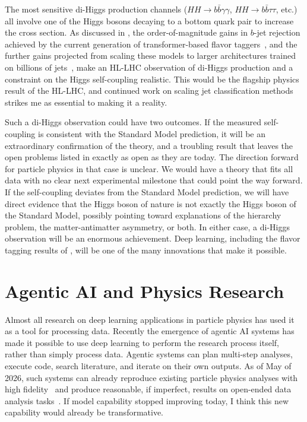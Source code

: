 The most sensitive di-Higgs production channels ($HH \rightarrow b\bar{b}\gamma\gamma$, $HH \rightarrow b\bar{b}\tau\tau$, etc.) all involve one of the Higgs bosons decaying to a bottom quark pair to increase the cross section.
As discussed in , the order-of-magnitude gains in $b$-jet rejection achieved by the current generation of transformer-based flavor taggers~\cite{ATLAS:2025dkv,Sarkar:2024vjz}, and the further gains projected from scaling these models to larger architectures trained on billions of jets~\cite{ATLAS:2026vyw,Vigl:2026ppx,Uslu:2026ywh}, make an HL-LHC observation of di-Higgs production and a constraint on the Higgs self-coupling realistic.
This would be the flagship physics result of the HL-LHC, and continued work on scaling jet classification methods strikes me as essential to making it a reality.

Such a di-Higgs observation could have two outcomes.
If the measured self-coupling is consistent with the Standard Model prediction, it will be an extraordinary confirmation of the theory, and a troubling result that leaves the open problems listed in  exactly as open as they are today.
The direction forward for particle physics in that case is unclear.
We would have a theory that fits all data with no clear next experimental milestone that could point the way forward.
If the self-coupling deviates from the Standard Model prediction, we will have direct evidence that the Higgs boson of nature is not exactly the Higgs boson of the Standard Model, possibly pointing toward explanations of the hierarchy problem, the matter-antimatter asymmetry, or both.
In either case, a di-Higgs observation will be an enormous achievement.
Deep learning, including the flavor tagging results of , will be one of the many innovations that make it possible.

\section{Agentic AI and Physics Research}
\label{sec:conclusion-agentic}

Almost all research on deep learning applications in particle physics has used it as a tool for processing data.
Recently the emergence of agentic AI systems has made it possible to use deep learning to perform the research process itself, rather than simply process data.
Agentic systems can plan multi-step analyses, execute code, search literature, and iterate on their own outputs.
As of May of 2026, such systems can already reproduce existing particle physics analyses with high fidelity~\cite{Birk:2026zpd} and produce reasonable, if imperfect, results on open-ended data analysis tasks~\cite{Moreno:2026mqk}.
If model capability stopped improving today, I think this new capability would already be transformative.

